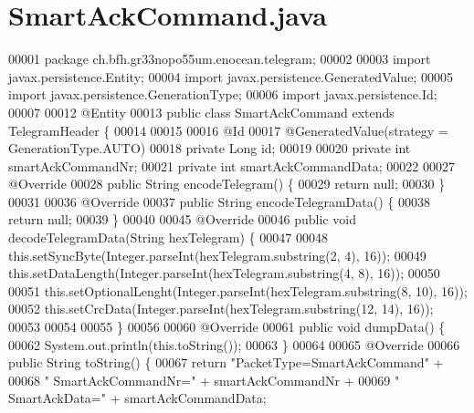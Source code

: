 \section{Smart\+Ack\+Command.\+java}
\label{SmartAckCommand_8java_source}

\begin{DoxyCode}
00001 \textcolor{keyword}{package }ch.bfh.gr33nopo55um.enocean.telegram;
00002 
00003 \textcolor{keyword}{import} javax.persistence.Entity;
00004 \textcolor{keyword}{import} javax.persistence.GeneratedValue;
00005 \textcolor{keyword}{import} javax.persistence.GenerationType;
00006 \textcolor{keyword}{import} javax.persistence.Id;
00007 
00012 @Entity
00013 \textcolor{keyword}{public} \textcolor{keyword}{class }SmartAckCommand \textcolor{keyword}{extends} TelegramHeader \{
00014 
00015 
00016     @Id
00017     @GeneratedValue(strategy = GenerationType.AUTO)
00018     private Long \textcolor{keywordtype}{id};
00019 
00020     private \textcolor{keywordtype}{int} smartAckCommandNr;
00021     private \textcolor{keywordtype}{int} smartAckCommandData;
00022 
00027     @Override
00028     public String encodeTelegram() \{
00029         \textcolor{keywordflow}{return} null;
00030     \}
00031 
00036     @Override
00037     \textcolor{keyword}{public} String encodeTelegramData() \{
00038         \textcolor{keywordflow}{return} null;
00039     \}
00040 
00045     @Override
00046     \textcolor{keyword}{public} \textcolor{keywordtype}{void} decodeTelegramData(String hexTelegram) \{
00047 
00048         this.setSyncByte(Integer.parseInt(hexTelegram.substring(2, 4), 16));
00049         this.setDataLength(Integer.parseInt(hexTelegram.substring(4, 8), 16));
00050 
00051         this.setOptionalLenght(Integer.parseInt(hexTelegram.substring(8, 10), 16));
00052         this.setCrcData(Integer.parseInt(hexTelegram.substring(12, 14), 16));
00053 
00054 
00055     \}
00056 
00060     @Override
00061     \textcolor{keyword}{public} \textcolor{keywordtype}{void} dumpData() \{
00062         System.out.println(this.toString());
00063     \}
00064 
00065     @Override
00066     \textcolor{keyword}{public} String toString() \{
00067         \textcolor{keywordflow}{return} \textcolor{stringliteral}{"PacketType=SmartAckCommand"} +
00068                 \textcolor{stringliteral}{" SmartAckCommandNr="} + smartAckCommandNr +
00069                 \textcolor{stringliteral}{" SmartAckData="} + smartAckCommandData;

\end{DoxyCode}
